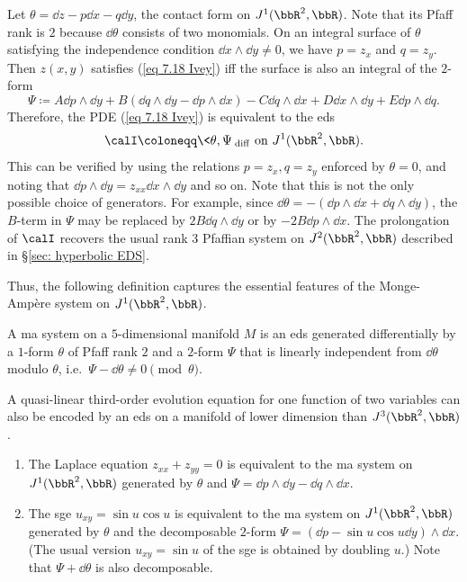 Let $\theta=\dd z-p\dd x-q\dd y$, the contact form on $J^1(\bbR^2,\bbR)$. Note that its Pfaff rank is $2$ because $\dd\theta$ consists of two monomials. On an integral surface of $\theta$ satisfying the independence condition $\dd x\wedge\dd y\neq 0$, we have $p=z_x$ and $q=z_y$. Then $z(x,y)$ satisfies (\ref{eq 7.18 Ivey}) iff the surface is also an integral of the $2$-form 
\[
    \Psi\coloneqq A\dd p\wedge \dd y+B(\dd q\wedge \dd y-\dd p\wedge \dd x)-C\dd q\wedge \dd x+D\dd x\wedge\dd y+E\dd p\wedge \dd q.\label{eq 7.19 Ivey}
\]
Therefore, the PDE (\ref{eq 7.18 Ivey}) is equivalent to the \gls{eds} 
\[\calI\coloneqq \<\theta,\Psi\>_{\mathrm{diff}} \text{ on }J^1(\bbR^2,\bbR).\]
This can be verified by using the relations $p=z_x,q=z_y$ enforced by $\theta=0$, and noting that $\dd p\wedge\dd y=z_{xx}\dd x\wedge \dd y$ and so on. Note that this is not the only possible choice of generators. For example, since $\dd\theta=-(\dd p\wedge\dd x+\dd q\wedge \dd y)$, the $B$-term in $\Psi$ may be replaced by $2B\dd q\wedge \dd y$ or by $-2B\dd p\wedge \dd x$. The prolongation of $\calI$ recovers the usual rank $3$ Pfaffian system on $J^2(\bbR^2,\bbR)$ described in \S\ref{sec: hyperbolic EDS}.

Thus, the following definition captures the essential features of the Monge-Amp\`ere system on $J^1(\bbR^2,\bbR)$.

\begin{defn}
    A \gls{ma} system on a $5$-dimensional manifold $M$ is an \gls{eds} generated differentially by a $1$-form $\theta$ of Pfaff rank $2$ and a $2$-form $\Psi$ that is linearly independent from $\dd\theta$ modulo $\theta$, i.e.\ $\Psi-\dd\theta\neq 0\pmod{\theta}$.
\end{defn}

\begin{rem}
    A quasi-linear third-order evolution equation for one function of two variables can also be encoded by an \gls{eds} on a manifold of lower dimension than $J^3(\bbR^2,\bbR)$.
\end{rem}

\begin{example}\label{ex 7.4.6 Ivey}
    \begin{enumerate}
        \item The Laplace equation $z_{xx}+z_{yy}=0$ is equivalent to the \gls{ma} system on $J^1(\bbR^2,\bbR)$ generated by $\theta$ and $\Psi=\dd p\wedge\dd y-\dd q\wedge \dd x$.
        \item The \gls{sge} $u_{xy}=\sin u\cos u$ is equivalent to the \gls{ma} system on $J^1(\bbR^2,\bbR)$ generated by $\theta$ and the decomposable $2$-form $\Psi=(\dd p-\sin u \cos u\dd y)\wedge\dd x$. (The usual version $u_{xy}=\sin u$ of the \gls{sge} is obtained by doubling $u$.) Note that $\Psi+\dd\theta$ is also decomposable.
    \end{enumerate}
\end{example}


